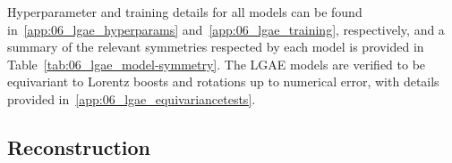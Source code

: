 Hyperparameter and training details for all models can be found in~\ref{app:06_lgae_hyperparams} and~\ref{app:06_lgae_training}, respectively, and a summary of the relevant symmetries respected by each model is provided in Table~\ref{tab:06_lgae_model-symmetry}.
The LGAE models are verified to be equivariant to Lorentz boosts and rotations up to numerical error, with details provided in~\ref{app:06_lgae_equivariancetests}.

\begin{table}[t!]
    \centering
    \captionsetup{justification=centering}
    \caption{Summary of the relevant symmetries respected by each model tested.}
    \label{tab:06_lgae_model-symmetry}
\end{table}

\subsection{Reconstruction}
\label{sec:06_lgae_reconstruction}


